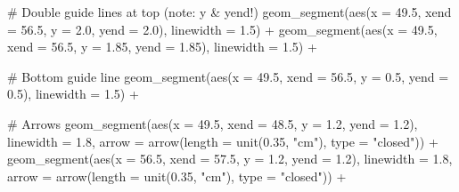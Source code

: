 \documentclass[
  letterpaper,
  DIV=11,
  numbers=noendperiod]{scrreprt}
\newenvironment{Shaded}{\begin{snugshade}}{\end{snugshade}}
\newcommand{\AttributeTok}[1]{\textcolor[rgb]{0.40,0.45,0.13}{#1}}
\newcommand{\CommentTok}[1]{\textcolor[rgb]{0.37,0.37,0.37}{#1}}
\newcommand{\FloatTok}[1]{\textcolor[rgb]{0.68,0.00,0.00}{#1}}
\newcommand{\FunctionTok}[1]{\textcolor[rgb]{0.28,0.35,0.67}{#1}}
\newcommand{\NormalTok}[1]{\textcolor[rgb]{0.00,0.23,0.31}{#1}}
\newcommand{\SpecialCharTok}[1]{\textcolor[rgb]{0.37,0.37,0.37}{#1}}
\newcommand{\StringTok}[1]{\textcolor[rgb]{0.13,0.47,0.30}{#1}}
\begin{document}
\begin{Shaded}
\begin{Highlighting}[]
  \CommentTok{\# Double guide lines at top (note: y \& yend!)}
  \FunctionTok{geom\_segment}\NormalTok{(}\FunctionTok{aes}\NormalTok{(}\AttributeTok{x =} \FloatTok{49.5}\NormalTok{, }\AttributeTok{xend =} \FloatTok{56.5}\NormalTok{, }\AttributeTok{y =} \FloatTok{2.0}\NormalTok{,  }\AttributeTok{yend =} \FloatTok{2.0}\NormalTok{),  }\AttributeTok{linewidth =} \FloatTok{1.5}\NormalTok{) }\SpecialCharTok{+}
  \FunctionTok{geom\_segment}\NormalTok{(}\FunctionTok{aes}\NormalTok{(}\AttributeTok{x =} \FloatTok{49.5}\NormalTok{, }\AttributeTok{xend =} \FloatTok{56.5}\NormalTok{, }\AttributeTok{y =} \FloatTok{1.85}\NormalTok{, }\AttributeTok{yend =} \FloatTok{1.85}\NormalTok{), }\AttributeTok{linewidth =} \FloatTok{1.5}\NormalTok{) }\SpecialCharTok{+}

  \CommentTok{\# Bottom guide line}
  \FunctionTok{geom\_segment}\NormalTok{(}\FunctionTok{aes}\NormalTok{(}\AttributeTok{x =} \FloatTok{49.5}\NormalTok{, }\AttributeTok{xend =} \FloatTok{56.5}\NormalTok{, }\AttributeTok{y =} \FloatTok{0.5}\NormalTok{,  }\AttributeTok{yend =} \FloatTok{0.5}\NormalTok{),  }\AttributeTok{linewidth =} \FloatTok{1.5}\NormalTok{) }\SpecialCharTok{+}

  \CommentTok{\# Arrows}
  \FunctionTok{geom\_segment}\NormalTok{(}\FunctionTok{aes}\NormalTok{(}\AttributeTok{x =} \FloatTok{49.5}\NormalTok{, }\AttributeTok{xend =} \FloatTok{48.5}\NormalTok{, }\AttributeTok{y =} \FloatTok{1.2}\NormalTok{, }\AttributeTok{yend =} \FloatTok{1.2}\NormalTok{),}
               \AttributeTok{linewidth =} \FloatTok{1.8}\NormalTok{, }\AttributeTok{arrow =} \FunctionTok{arrow}\NormalTok{(}\AttributeTok{length =} \FunctionTok{unit}\NormalTok{(}\FloatTok{0.35}\NormalTok{, }\StringTok{"cm"}\NormalTok{), }\AttributeTok{type =} \StringTok{"closed"}\NormalTok{)) }\SpecialCharTok{+}
  \FunctionTok{geom\_segment}\NormalTok{(}\FunctionTok{aes}\NormalTok{(}\AttributeTok{x =} \FloatTok{56.5}\NormalTok{, }\AttributeTok{xend =} \FloatTok{57.5}\NormalTok{, }\AttributeTok{y =} \FloatTok{1.2}\NormalTok{, }\AttributeTok{yend =} \FloatTok{1.2}\NormalTok{),}
               \AttributeTok{linewidth =} \FloatTok{1.8}\NormalTok{, }\AttributeTok{arrow =} \FunctionTok{arrow}\NormalTok{(}\AttributeTok{length =} \FunctionTok{unit}\NormalTok{(}\FloatTok{0.35}\NormalTok{, }\StringTok{"cm"}\NormalTok{), }\AttributeTok{type =} \StringTok{"closed"}\NormalTok{)) }\SpecialCharTok{+}


\end{Highlighting}
\end{Shaded}
\end{document}
